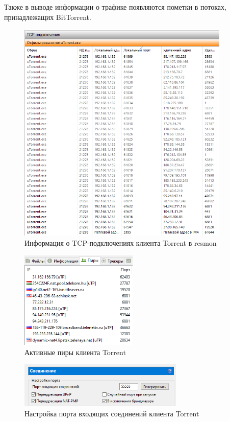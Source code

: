 \documentclass[bachelor, och, coursework]{SCWorks}
\begin{document}
Также в выводе информации о трафике появляются пометки в потоках, принадлежащих BitTorrent.

\begin{figure}[H]
    \centering
    \includegraphics[width=0.9\textwidth]{test2_resmon.png}
    \caption{Информация о TCP-подключениях клиента \textmu Torrent в resmon}
    \label{test2_resmon}
\end{figure}

\begin{figure}[H]
    \centering
    \includegraphics[width=0.5\textwidth]{test2_peers.png}
    \caption{Активные пиры клиента \textmu Torrent}
    \label{test2_peers}
\end{figure}

\begin{figure}[H]
    \centering
    \includegraphics[width=0.7\textwidth]{test2_btset.png}
    \caption{Настройка порта входящих соединений клиента \textmu Torrent}
    \label{test2_btset}
\end{figure}
\end{document}
